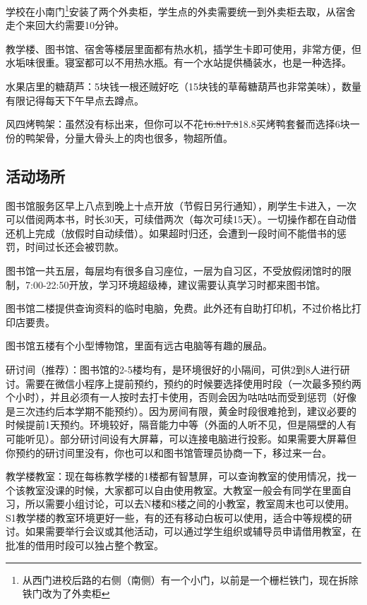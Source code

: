 
学校在小南门\footnote{从西门进校后路的右侧（南侧）有一个小门，以前是一个栅栏铁门，现在拆除铁门改为了外卖柜}安装了两个外卖柜，学生点的外卖需要统一到外卖柜去取，从宿舍走个来回大约需要10分钟。


教学楼、图书馆、宿舍等楼层里面都有热水机，插学生卡即可使用，非常方便，但水垢味很重。寝室都可以不用热水瓶。有一个水站提供桶装水，也是一种选择。


水果店里的糖葫芦：5块钱一根还贼好吃（15块钱的草莓糖葫芦也非常美味），数量有限记得每天下午早点去蹲点。

风四烤鸭架：虽然没有标出来，但你可以不花\sout{16.8}\sout{17.8}18.8买烤鸭套餐而选择6块一份的鸭架骨，分量大骨头上的肉也很多，物超所值。

\subsection{活动场所}


图书馆服务区早上八点到晚上十点开放（节假日另行通知），刷学生卡进入，一次可以借阅两本书，时长30天，可续借两次（每次可续15天）。一切操作都在自动借还机上完成（放假时自动续借）。如果超时归还，会遭到一段时间不能借书的惩罚，时间过长还会被罚款。

图书馆一共五层，每层均有很多自习座位，一层为自习区，不受放假闭馆时的限制，7:00-22:50开放，学习环境超级棒，建议需要认真学习时都来图书馆。

图书馆二楼提供查询资料的临时电脑，免费。此外还有自助打印机，不过价格比打印店要贵。

图书馆五楼有个小型博物馆，里面有远古电脑等有趣的展品。


研讨间（推荐）：图书馆的2-5楼均有，是环境很好的小隔间，可供2到8人进行研讨。需要在微信小程序上提前预约，预约的时候要选择使用时段（一次最多预约两个小时），并且必须有一人按时去打卡使用，否则会因为咕咕咕而受到惩罚（好像是三次违约后本学期不能预约）。因为房间有限，黄金时段很难抢到，建议必要的时候提前1天预约。环境较好，隔音能力中等（外面的人听不见，但是隔壁的人有可能听见）。部分研讨间设有大屏幕，可以连接电脑进行投影。如果需要大屏幕但你预约的研讨间里没有，你也可以和图书馆管理员协商一下，移过来一台。

教学楼教室：现在每栋教学楼的1楼都有智慧屏，可以查询教室的使用情况，找一个该教室没课的时候，大家都可以自由使用教室。大教室一般会有同学在里面自习，所以需要小组讨论，可以去N楼和S楼之间的小教室，教室周末也可以使用。S1教学楼的教室环境更好一些，有的还有移动白板可以使用，适合中等规模的研讨。如果需要举行会议或其他活动，可以通过学生组织或辅导员申请借用教室，在批准的借用时段可以独占整个教室。

